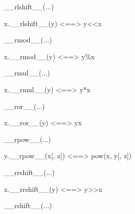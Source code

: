 \documentclass[letterpaper,10pt,english]{sphinxmanual}
\begin{document}
\begin{description}
\begin{description}
\begin{DUlineblock}{0em}
\begin{DUlineblock}{\DUlineblockindent}
\item[] 
\end{DUlineblock}
\item[] \_\_rlshift\_\_(...)
\item[]
\begin{DUlineblock}{\DUlineblockindent}
\item[] x.\_\_rlshift\_\_(y) \textless{}==\textgreater{} y\textless{}\textless{}x
\item[] 
\end{DUlineblock}
\item[] \_\_rmod\_\_(...)
\item[]
\begin{DUlineblock}{\DUlineblockindent}
\item[] x.\_\_rmod\_\_(y) \textless{}==\textgreater{} y\%x
\item[] 
\end{DUlineblock}
\item[] \_\_rmul\_\_(...)
\item[]
\begin{DUlineblock}{\DUlineblockindent}
\item[] x.\_\_rmul\_\_(y) \textless{}==\textgreater{} y*x
\item[] 
\end{DUlineblock}
\item[] \_\_ror\_\_(...)
\item[]
\begin{DUlineblock}{\DUlineblockindent}
\item[] x.\_\_ror\_\_(y) \textless{}==\textgreater{} y\textbar{}x
\item[] 
\end{DUlineblock}
\item[] \_\_rpow\_\_(...)
\item[]
\begin{DUlineblock}{\DUlineblockindent}
\item[] y.\_\_rpow\_\_(x{[}, z{]}) \textless{}==\textgreater{} pow(x, y{[}, z{]})
\item[] 
\end{DUlineblock}
\item[] \_\_rrshift\_\_(...)
\item[]
\begin{DUlineblock}{\DUlineblockindent}
\item[] x.\_\_rrshift\_\_(y) \textless{}==\textgreater{} y\textgreater{}\textgreater{}x
\item[] 
\end{DUlineblock}
\item[] \_\_rshift\_\_(...)

\end{DUlineblock}
\end{description}
\end{description}
\end{document}
